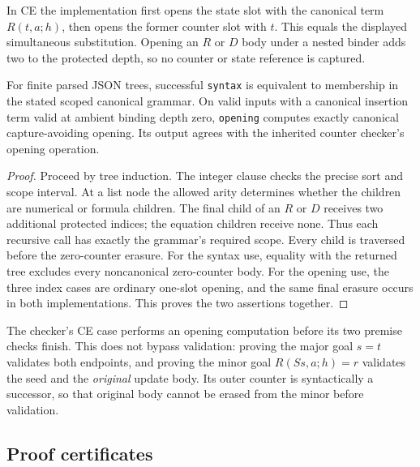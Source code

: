 In CE the implementation first opens the state slot with the canonical
term $R(t,a;h)$, then opens the former counter slot with $t$. This equals
the displayed simultaneous substitution. Opening an $R$ or $D$ body
under a nested binder adds two to the protected depth, so no counter or
state reference is captured.

\begin{lemma}\label{lem:walker}
For finite parsed JSON trees, successful \texttt{syntax} is equivalent
to membership in the stated scoped canonical grammar. On valid inputs
with a canonical insertion term valid at ambient binding depth zero, \texttt{opening} computes exactly
canonical capture-avoiding opening. Its output agrees with the inherited
counter checker's opening operation.
\end{lemma}
\begin{proof}
Proceed by tree induction. The integer clause checks the precise sort
and scope interval. At a list node the allowed arity determines whether
the children are numerical or formula children. The final child of an
$R$ or $D$ receives two additional protected indices; the equation
children receive none. Thus each recursive call has exactly the grammar's
required scope. Every child is traversed before the zero-counter erasure.
For the syntax use, equality with the returned tree excludes every
noncanonical zero-counter body. For the opening use, the three index
cases are ordinary one-slot opening, and the same final erasure occurs
in both implementations. This proves the two assertions together.
\end{proof}

The checker's CE case performs an opening computation before its two
premise checks finish. This does not bypass validation: proving the
major goal $s=t$ validates both endpoints, and proving the minor goal
$R(Ss,a;h)=r$ validates the seed and the \emph{original} update body.
Its outer counter is syntactically a successor, so that original body
cannot be erased from the minor before validation.

\subsection{Proof certificates}

